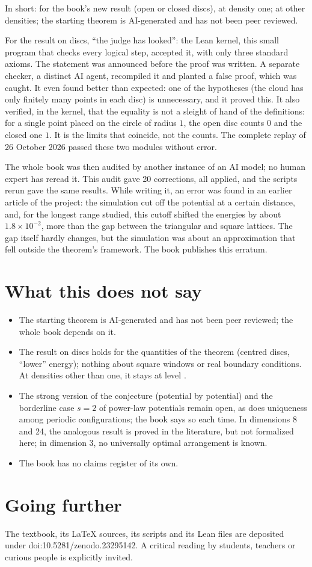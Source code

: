 In short:  for the book's new result (open or closed discs), at density one;  at other
densities; the starting theorem is AI-generated and has not been peer reviewed.

For the result on discs, ``the judge has looked'': the Lean kernel, this small program that checks every logical
step, accepted it, with only three standard axioms. The statement was announced before the proof was written. A
separate checker, a distinct AI agent, recompiled it and planted a false proof, which was caught. It even found
better than expected: one of the hypotheses (the cloud has only finitely many points in each disc) is unnecessary,
and it proved this. It also verified, in the kernel, that the equality is not a sleight of hand of the definitions:
for a single point placed on the circle of radius $1$, the open disc counts $0$ and the closed one $1$. It is the
limits that coincide, not the counts. The complete replay of 26 October 2026 passed these two modules without
error.

The whole book was then audited by another instance of an AI model; no human expert has reread it. This audit gave
20 corrections, all applied, and the scripts rerun gave the same results. While writing it, an error was found in an
earlier article of the project: the simulation cut off the potential at a certain distance, and, for the longest
range studied, this cutoff shifted the energies by about $1.8\times10^{-2}$, more than the gap between the
triangular and square lattices. The gap itself hardly changes, but the simulation was about an approximation that
fell outside the theorem's framework. The book publishes this erratum.

\section*{What this does not say}

\begin{limite}
\begin{itemize}
\item The starting theorem is AI-generated and has not been peer reviewed; the whole book depends on it.
\item The result on discs holds for the quantities of the theorem (centred discs, ``lower'' energy); nothing about
  square windows or real boundary conditions. At densities other than one, it stays at level .
\item The strong version of the conjecture (potential by potential) and the borderline case $s=2$ of power-law
  potentials remain open, as does uniqueness among periodic configurations; the book says so each time. In
  dimensions 8 and 24, the analogous result is proved in the literature, but not formalized here; in dimension 3,
  no universally optimal arrangement is known.
\item The book has no claims register of its own.
\end{itemize}
\end{limite}

\section*{Going further}

The textbook, its \LaTeX{} sources, its scripts and its Lean files are deposited under
doi:10.5281/\allowbreak zenodo.23295142. A critical reading by students, teachers or curious people is explicitly
invited.
